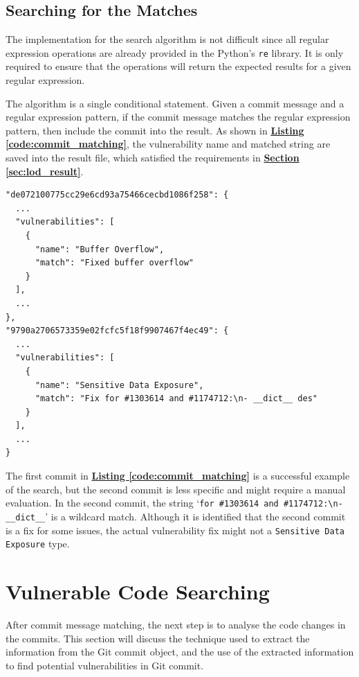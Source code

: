 \documentclass[12pt, a4paper]{report}
\begin{document}
\subsection{Searching for the Matches}
The implementation for the search algorithm is not difficult since all regular expression operations
are already provided in the Python's \texttt{re} \cite{python_re} library. It is only required to
ensure that the operations will return the expected results for a given regular expression.

The algorithm is a single conditional statement. Given a commit message and a regular expression
pattern, if the commit message matches the regular expression pattern, then include the commit into
the result. As shown in \hyperref[code:commit_matching]{\textbf{Listing
\ref*{code:commit_matching}}}, the vulnerability name and matched string are saved into the result
file, which satisfied the requirements in \hyperref[sec:lod_result]{\textbf{Section
\ref*{sec:lod_result}}}.

\begin{lstlisting}[basicstyle=\ttfamily, label=code:commit_matching,
  caption=A partial snippet of the result file of CPython \cite{cpython_repo} repository.]
"de072100775cc29e6cd93a75466cecbd1086f258": {
  ...
  "vulnerabilities": [
    {
      "name": "Buffer Overflow",
      "match": "Fixed buffer overflow"
    }
  ],
  ...
},
"9790a2706573359e02fcfc5f18f9907467f4ec49": {
  ...
  "vulnerabilities": [
    {
      "name": "Sensitive Data Exposure",
      "match": "Fix for #1303614 and #1174712:\n- __dict__ des"
    }
  ],
  ...
}
\end{lstlisting}

The first commit in \hyperref[code:commit_matching]{\textbf{Listing \ref*{code:commit_matching}}} is
a successful example of the search, but the second commit is less specific and might require a
manual evaluation. In the second commit, the string `\texttt{for \#1303614 and
\#1174712:\textbackslash n- \_\_dict\_\_}' is a wildcard match. Although it is identified that the
second commit is a fix for some issues, the actual vulnerability fix might not a \texttt{Sensitive
Data Exposure} type.

\section{Vulnerable Code Searching} \label{sec:imp_vuln_code_search}
After commit message matching, the next step is to analyse the code changes in the commits. This
section will discuss the technique used to extract the information from the Git commit object, and
the use of the extracted information to find potential vulnerabilities in Git commit.
\end{document}
